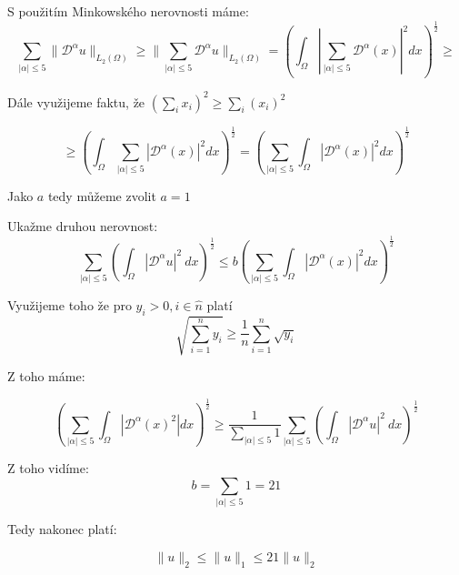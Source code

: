 \documentclass[../main.tex]{subfiles}
\begin{document}
S použitím Minkowského nerovnosti máme:
\begin{equation}
    \sum_{|\alpha| \leq 5} \| \mathcal{D}^\alpha u \|_{L_2(\Omega)}  \geq  \| \sum_{|\alpha| \leq 5} \mathcal{D}^\alpha u \|_{L_2(\Omega)} =  \left(  \int_\Omega \left| \sum_{|\alpha| \leq 5} \mathcal{D}^\alpha(x)\right|^2 dx\right)^\frac{1}{2} \geq
\end{equation}

Dále využijeme faktu, že $ \left(\sum_i x_i\right)^2 \geq \sum_i \left( x_i\right)^2$

\begin{equation}
    \geq \left(  \int_\Omega  \sum_{|\alpha| \leq 5} \left|\mathcal{D}^\alpha(x)\right|^2 dx\right)^\frac{1}{2} = \left(  \sum_{|\alpha| \leq 5}\int_\Omega \left|  \mathcal{D}^\alpha(x)\right|^2 dx\right)^\frac{1}{2}
\end{equation}

Jako $a$ tedy můžeme zvolit $a=1$






Ukažme druhou nerovnost: 
\begin{equation*}
    \sum_{|\alpha| \leq 5} \left( \int_\Omega| \mathcal{D}^\alpha u |^2 \ dx  \right)^\frac{1}{2} \leq b \left( \sum_{|\alpha| \leq 5} \int_\Omega | \mathcal{D}^\alpha(x)|^2 dx\right)^\frac{1}{2}
\end{equation*} 

Využijeme toho že pro $y_i > 0, i\in\hat{n}$ platí
\begin{equation}
    \sqrt{\sum_{i=1}^{n}y_i} \geq \frac{1}{n} \sum_{i=1}^{n}\sqrt{y_i}
\end{equation}

Z toho máme:

\begin{equation}
    \left(\sum_{|\alpha|\leq5}\int_\Omega |\mathcal{D}^\alpha (x)^2| dx\right)^\frac{1}{2} \geq \frac{1}{\sum_{|\alpha|\leq5}1} \sum_{|\alpha| \leq 5} \left( \int_\Omega| \mathcal{D}^\alpha u |^2 \ dx  \right)^\frac{1}{2}
\end{equation}

Z toho vidíme:
$$
b = \sum_{|\alpha|\leq5}1 = 21
$$



Tedy nakonec platí:

\begin{equation}
    \|u\|_2 \leq \|u\|_1 \leq 21\|u\|_2
\end{equation}
\end{document}
